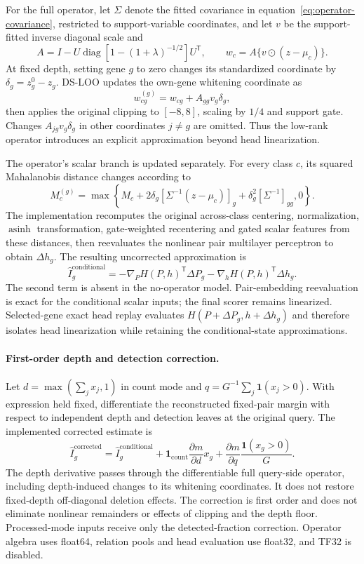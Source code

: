 For the full operator, let $\Sigma$ denote the fitted covariance in equation~\ref{eq:operator-covariance}, restricted to support-variable coordinates, and let $v$ be the support-fitted inverse diagonal scale and
\[
 A=I-U\operatorname{diag}\!\left[1-(1+\lambda)^{-1/2}\right]U^{\mathsf T},
 \qquad w_c=A\{v\odot(z-\mu_c)\}.
\]
At fixed depth, setting gene $g$ to zero changes its standardized coordinate by $\delta_g=z_g^0-z_g$. DS-LOO updates the own-gene whitening coordinate as
\[
 w_{cg}^{(g)}=w_{cg}+A_{gg}v_g\delta_g,
\]
then applies the original clipping to $[-8,8]$, scaling by $1/4$ and support gate. Changes $A_{jg}v_g\delta_g$ in other coordinates $j\ne g$ are omitted. Thus the low-rank operator introduces an explicit approximation beyond head linearization.

The operator's scalar branch is updated separately. For every class $c$, its squared Mahalanobis distance changes according to
\[
 M_c^{(g)}=\max\!\left\{M_c+
 2\delta_g[\Sigma^{-1}(z-\mu_c)]_g+
 \delta_g^2[\Sigma^{-1}]_{gg},0\right\}.
\]
The implementation recomputes the original across-class centering, normalization, $\operatorname{asinh}$ transformation, gate-weighted recentering and gated scalar features from these distances, then reevaluates the nonlinear pair multilayer perceptron to obtain $\Delta h_g$. The resulting uncorrected approximation is
\[
 \widehat I_g^{\mathrm{conditional}}
 =-\nabla_P H(P,h)^{\mathsf T}\Delta P_g
  -\nabla_h H(P,h)^{\mathsf T}\Delta h_g.
\]
The second term is absent in the no-operator model. Pair-embedding reevaluation is exact for the conditional scalar inputs; the final scorer remains linearized. Selected-gene exact head replay evaluates $H(P+\Delta P_g,h+\Delta h_g)$ and therefore isolates head linearization while retaining the conditional-state approximations.

\paragraph{First-order depth and detection correction.}
Let $d=\max(\sum_jx_j,1)$ in count mode and $q=G^{-1}\sum_j\mathbf1(x_j>0)$. With expression held fixed, differentiate the reconstructed fixed-pair margin with respect to independent depth and detection leaves at the original query. The implemented corrected estimate is
\[
 \widehat I_g^{\mathrm{corrected}}
 =\widehat I_g^{\mathrm{conditional}}
 +\mathbf1_{\mathrm{count}}\frac{\partial m}{\partial d}x_g
 +\frac{\partial m}{\partial q}\frac{\mathbf1(x_g>0)}{G}.
\]
The depth derivative passes through the differentiable full query-side operator, including depth-induced changes to its whitening coordinates. It does not restore fixed-depth off-diagonal deletion effects. The correction is first order and does not eliminate nonlinear remainders or effects of clipping and the depth floor. Processed-mode inputs receive only the detected-fraction correction. Operator algebra uses float64, relation pools and head evaluation use float32, and TF32 is disabled.

